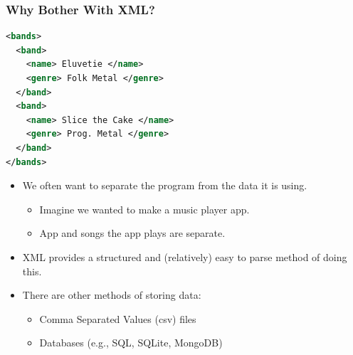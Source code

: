 \documentclass{beamer}
\begin{document}
\begin{frame}[fragile]
    \frametitle{Why Bother With XML?}
    \begin{minipage}{0.4\textwidth}
        \begin{lstlisting}[basicstyle=\tiny, language=XML]
<bands>
  <band>
    <name> Eluvetie </name>
    <genre> Folk Metal </genre>
  </band>
  <band>
    <name> Slice the Cake </name>
    <genre> Prog. Metal </genre>
  </band>
</bands>
        \end{lstlisting}
    \end{minipage}
    \begin{minipage}{0.59\textwidth}
        \begin{itemize}
            \item We often want to separate the program from the data it is using.
                \begin{itemize}
                    \item Imagine we wanted to make a music player app. 
                    \item App and songs the app plays are separate.
                \end{itemize}
            \item XML provides a structured and (relatively) easy to parse method of doing this.
            \item There are other methods of storing data:
            \begin{itemize}
                \item Comma Separated Values (csv) files
                \item Databases (e.g., SQL, SQLite, MongoDB)
            \end{itemize}
        \end{itemize}
    \end{minipage}
\end{frame}
\end{document}
